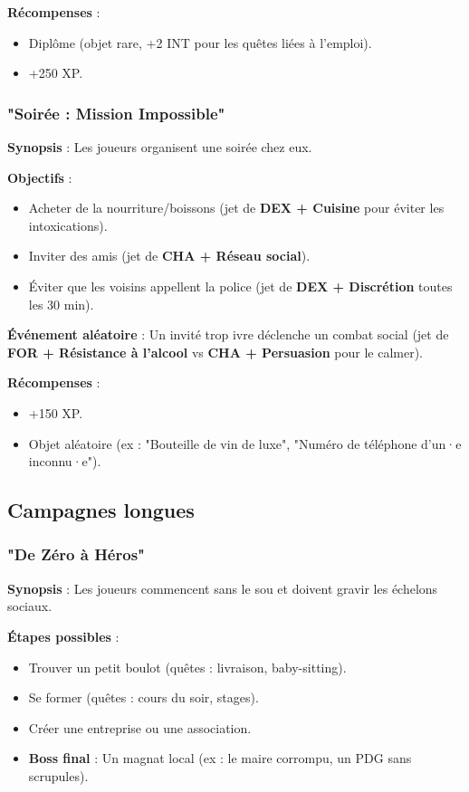 \documentclass[11pt, a4paper]{article}
\begin{document}
\textbf{Récompenses} :
\begin{itemize}
    \item Diplôme (objet rare, +2 INT pour les quêtes liées à l'emploi).
    \item +250 XP.
\end{itemize}

\subsubsection{"Soirée : Mission Impossible"}
\textbf{Synopsis} : Les joueurs organisent une soirée chez eux.

\textbf{Objectifs} :
\begin{itemize}
    \item Acheter de la nourriture/boissons (jet de \textbf{DEX + Cuisine} pour éviter les intoxications).
    \item Inviter des amis (jet de \textbf{CHA + Réseau social}).
    \item Éviter que les voisins appellent la police (jet de \textbf{DEX + Discrétion} toutes les 30 min).
\end{itemize}

\textbf{Événement aléatoire} : Un invité trop ivre déclenche un combat social (jet de \textbf{FOR + Résistance à l'alcool} vs \textbf{CHA + Persuasion} pour le calmer).

\textbf{Récompenses} :
\begin{itemize}
    \item +150 XP.
    \item Objet aléatoire (ex : "Bouteille de vin de luxe", "Numéro de téléphone d'un·e inconnu·e").
\end{itemize}

\subsection{Campagnes longues}
\subsubsection{"De Zéro à Héros"}
\textbf{Synopsis} : Les joueurs commencent sans le sou et doivent gravir les échelons sociaux.

\textbf{Étapes possibles} :
\begin{itemize}
    \item Trouver un petit boulot (quêtes : livraison, baby-sitting).
    \item Se former (quêtes : cours du soir, stages).
    \item Créer une entreprise ou une association.
    \item \textbf{Boss final} : Un magnat local (ex : le maire corrompu, un PDG sans scrupules).
\end{itemize}
\end{document}

